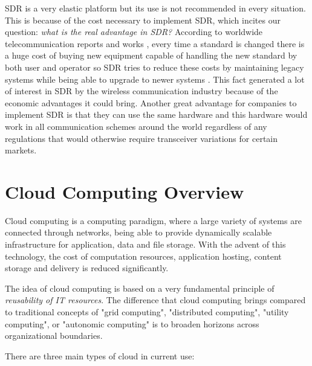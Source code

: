 SDR is a very elastic platform but its use is not recommended in every
situation. This is because of the cost necessary to implement SDR, which incites
our question: \emph{what is the real advantage in SDR?} According to worldwide
telecommunication reports and works \cite{introlte}, every time a standard is
changed there is a huge cost of buying new equipment capable of handling the new
standard by both user and operator so SDR tries to reduce these costs by
maintaining legacy systems while being able to upgrade to newer
systems \cite{dayananda2012}. This fact generated a lot of interest in SDR by the
wireless communication industry because of the economic advantages it could
bring. Another great advantage for companies to implement SDR is that they can
use the same hardware and this hardware would work in all communication schemes
around the world regardless of any regulations that would otherwise require
transceiver variations for certain markets.


\section{Cloud Computing Overview}
\label{sec:sdr_cloud}

Cloud computing is a computing paradigm, where a large variety of systems are
connected through networks, being able to provide dynamically scalable
infrastructure for application, data and file storage. With the advent of this
technology, the cost of computation resources, application hosting, content
storage and delivery is reduced significantly.


The idea of cloud computing is based on a very fundamental principle of
\emph{reusability of IT resources}. The difference that cloud computing brings
compared to traditional concepts of "grid computing", "distributed computing",
"utility computing", or "autonomic computing" is to broaden horizons across
organizational boundaries.

There are three main types of cloud in current use:

